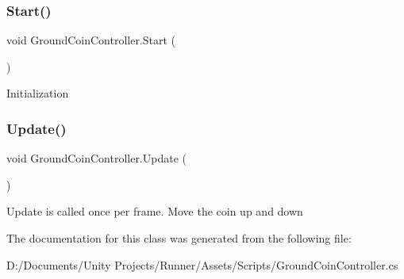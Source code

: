 \subsubsection{\texorpdfstring{Start()}{Start()}}
{\footnotesize\ttfamily void Ground\+Coin\+Controller.\+Start (\begin{DoxyParamCaption}{ }\end{DoxyParamCaption})\hspace{0.3cm}{\ttfamily [private]}}

Initialization \mbox{\label{class_ground_coin_controller_aecea952d64783d72a80c7eeb5661cb99}} 
\subsubsection{\texorpdfstring{Update()}{Update()}}
{\footnotesize\ttfamily void Ground\+Coin\+Controller.\+Update (\begin{DoxyParamCaption}{ }\end{DoxyParamCaption})\hspace{0.3cm}{\ttfamily [private]}}

Update is called once per frame. Move the coin up and down 

The documentation for this class was generated from the following file\+:\begin{DoxyCompactItemize}
\item 
D\+:/\+Documents/\+Unity Projects/\+Runner/\+Assets/\+Scripts/Ground\+Coin\+Controller.\+cs\end{DoxyCompactItemize}
